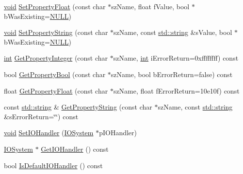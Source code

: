 \begin{DoxyCompactItemize}
\item 
\hyperlink{_s_d_l__opengl_8h_a3db05964a3cc4410f35b7ea2b7eb850d}{void} \hyperlink{class_assimp_1_1_importer_ab264807393b68662d1672c2b05e1c0cd}{Set\-Property\-Float} (const char $\ast$sz\-Name, float f\-Value, bool $\ast$b\-Was\-Existing=\hyperlink{begin__code_8h_a070d2ce7b6bb7e5c05602aa8c308d0c4}{N\-U\-L\-L})
\item 
\hyperlink{_s_d_l__opengl_8h_a3db05964a3cc4410f35b7ea2b7eb850d}{void} \hyperlink{class_assimp_1_1_importer_a8f79ecb5c6f67a76fc87654c32986e8e}{Set\-Property\-String} (const char $\ast$sz\-Name, const \hyperlink{_s_d_l__opengl_8h_a4643b88e2349494c65861169f8944eca}{std\-::string} \&s\-Value, bool $\ast$b\-Was\-Existing=\hyperlink{begin__code_8h_a070d2ce7b6bb7e5c05602aa8c308d0c4}{N\-U\-L\-L})
\item 
\hyperlink{_s_d_l__thread_8h_a6a64f9be4433e4de6e2f2f548cf3c08e}{int} \hyperlink{class_assimp_1_1_importer_a3e796a0758a9f10f13107f44c542ad41}{Get\-Property\-Integer} (const char $\ast$sz\-Name, \hyperlink{_s_d_l__thread_8h_a6a64f9be4433e4de6e2f2f548cf3c08e}{int} i\-Error\-Return=0xffffffff) const 
\item 
bool \hyperlink{class_assimp_1_1_importer_a90f5d35d25e5d2a0ef8bc0c6545b2010}{Get\-Property\-Bool} (const char $\ast$sz\-Name, bool b\-Error\-Return=false) const 
\item 
float \hyperlink{class_assimp_1_1_importer_a9a99a3467d6386ddcfbe2823f16b6640}{Get\-Property\-Float} (const char $\ast$sz\-Name, float f\-Error\-Return=10e10f) const 
\item 
const \hyperlink{_s_d_l__opengl_8h_a4643b88e2349494c65861169f8944eca}{std\-::string} \& \hyperlink{class_assimp_1_1_importer_a4d64ee7131d6c26dc9688de85d142f14}{Get\-Property\-String} (const char $\ast$sz\-Name, const \hyperlink{_s_d_l__opengl_8h_a4643b88e2349494c65861169f8944eca}{std\-::string} \&s\-Error\-Return=\char`\"{}\char`\"{}) const 
\item 
\hyperlink{_s_d_l__opengl_8h_a3db05964a3cc4410f35b7ea2b7eb850d}{void} \hyperlink{class_assimp_1_1_importer_a1161f46318af18bb86dfe0fc3edea4df}{Set\-I\-O\-Handler} (\hyperlink{class_assimp_1_1_i_o_system}{I\-O\-System} $\ast$p\-I\-O\-Handler)
\item 
\hyperlink{class_assimp_1_1_i_o_system}{I\-O\-System} $\ast$ \hyperlink{class_assimp_1_1_importer_abe3af30f4c5eae2e875b0f32068be44d}{Get\-I\-O\-Handler} () const 
\item 
bool \hyperlink{class_assimp_1_1_importer_ae3f26466cf7756594216ffedbc247563}{Is\-Default\-I\-O\-Handler} () const 

\end{DoxyCompactItemize}
